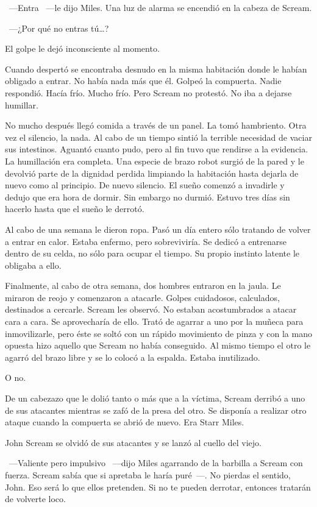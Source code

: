 ~---Entra ~---le dijo Miles. Una luz de alarma se encendió en la cabeza de Scream.

~---¿Por qué no entras tú\dots?

El golpe le dejó inconsciente al momento.

Cuando despertó se encontraba desnudo en la misma habitación donde le habían obligado a entrar. No había nada más que él. Golpeó la compuerta. Nadie respondió. Hacía frío. Mucho frío. Pero Scream no protestó. No iba a dejarse humillar.

No mucho después llegó comida a través de un panel. La tomó hambriento. Otra vez el silencio, la nada. Al cabo de un tiempo sintió la terrible necesidad de vaciar sus intestinos. Aguantó cuanto pudo, pero al fin tuvo que rendirse a la evidencia. La humillación era completa. Una especie de brazo robot surgió de la pared y le devolvió parte de la dignidad perdida limpiando la habitación hasta dejarla de nuevo como al principio. De nuevo silencio. El sueño comenzó a invadirle y dedujo que era hora de dormir. Sin embargo no durmió. Estuvo tres días sin hacerlo hasta que el sueño le derrotó.

Al cabo de una semana le dieron ropa. Pasó un día entero sólo tratando de volver a entrar en calor. Estaba enfermo, pero sobreviviría. Se dedicó a entrenarse dentro de su celda, no sólo para ocupar el tiempo. Su propio instinto latente le obligaba a ello.

Finalmente, al cabo de otra semana, dos hombres entraron en la jaula. Le miraron de reojo y comenzaron a atacarle. Golpes cuidadosos, calculados, destinados a cercarle. Scream les observó. No estaban acostumbrados a atacar cara a cara. Se aprovecharía de ello. Trató de agarrar a uno por la muñeca para inmovilizarle, pero éste se soltó con un rápido movimiento de pinza y con la mano opuesta hizo aquello que Scream no había conseguido. Al mismo tiempo el otro le agarró del brazo libre y se lo colocó a la espalda. Estaba inutilizado.

O no.

De un cabezazo que le dolió tanto o más que a la víctima, Scream derribó a uno de sus atacantes mientras se zafó de la presa del otro. Se disponía a realizar otro ataque cuando la compuerta se abrió de nuevo. Era Starr Miles.

John Scream se olvidó de sus atacantes y se lanzó al cuello del viejo.

~---Valiente pero impulsivo ~---dijo Miles agarrando de la barbilla a Scream con fuerza. Scream sabía que si apretaba le haría puré~---. No pierdas el sentido, John. Eso será lo que ellos pretenden. Si no te pueden derrotar, entonces tratarán de volverte loco.


